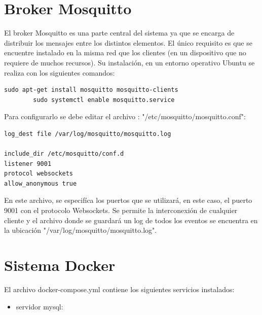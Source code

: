 		
		
\section{Broker Mosquitto}

El broker Mosquitto es una parte central del sistema ya que se encarga de distribuir los mensajes entre los distintos elementos. El único requisito es que se encuentre instalado en la misma red que los clientes (en un dispositivo que no requiere de muchos recursos). Su instalación, en un entorno operativo Ubuntu se realiza con los siguientes comandos:




\begin{lstlisting}[caption=  Instalación/lanzamiento del broker Mosquitto]
		sudo apt-get install mosquitto mosquitto-clients
		sudo systemctl enable mosquitto.service
\end{lstlisting}

Para configurarlo se debe editar el archivo : "/etc/mosquitto/mosquitto.conf":

\begin{lstlisting}[caption=  Contenido archivo mosquitto.conf]
log_dest file /var/log/mosquitto/mosquitto.log

include_dir /etc/mosquitto/conf.d
listener 9001
protocol websockets
allow_anonymous true

\end{lstlisting}

En este archivo, se especifíca los puertos que se utilizará, en este caso, el puerto 9001 con el protocolo Websockets. Se permite la interconexión de cualquier cliente y el archivo donde se guardará un log de todos los eventos se encuentra en la ubicación "/var/log/mosquitto/mosquitto.log".

\pagebreak
\section{Sistema Docker}

El archivo docker-compose.yml contiene los siguientes servicios instalados:

\begin{itemize}
\item servidor mysql:




\end{itemize}





